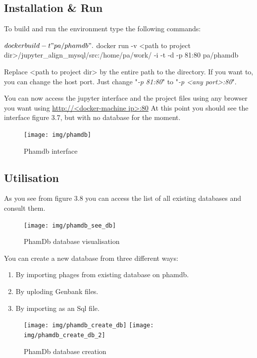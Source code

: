 \documentclass[a4paper,11pt]{report}
\begin{document}
\subsection{Installation \& Run}
To build and run the environment type the following commands:
\begin{javacode}
$ docker build -t "pa/phamdb" .
$ docker run -v <path to project dir>/jupyter_align_mysql/src:/home/pa/work/ -i -t -d -p 81:80 pa/phamdb
\end{javacode}

Replace <path to project dir> by the entire path to the directory. If you want to, you can change the host port. Just change "\textit{-p 81:80}" to "\textit{-p <any port>:80}".

You can now access the jupyter interface and the project files using any browser you want using \url{http://<docker-machine ip>:80}
\newpage
At this point you should see the interface figure 3.7, but with no database for the moment.

\begin{figure}[H] 
	\begin{center}
		\texttt{[image: img/phamdb]}
		\caption{Phamdb interface}
	\end{center}
\end{figure}

\subsection{Utilisation}
As you see from figure 3.8 you can access the list of all existing databases and consult them.

\begin{figure}[H] 
	\begin{center}
		\texttt{[image: img/phamdb\_see\_db]}
		\caption{PhamDb database visualisation}
	\end{center}
\end{figure}

You can create a new database from three different ways:
\begin{enumerate}
	\item By importing phages from existing database on phamdb.
	\item By uploding Genbank files.
	\item By importing as an Sql file.
\end{enumerate}

\begin{figure}[H] 
	\begin{center}
		\texttt{[image: img/phamdb\_create\_db]}
		\texttt{[image: img/phamdb\_create\_db\_2]}
		\caption{PhamDb database creation}
	\end{center}
\end{figure}
\newpage
\end{document}
